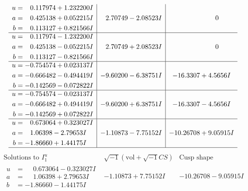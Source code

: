 \documentclass[1p]{elsarticle_modified}
\theoremstyle{definition}
\newcommand{\I}{\sqrt{-1}}
\begin{document}
$$\begin{array}{c|c|c}
\begin{aligned}
u &= \phantom{-}0.117974 + 1.232200 I \\
a &= \phantom{-}0.425138 + 0.052215 I \\
b &= \phantom{-}0.113127 + 0.821566 I\end{aligned}
 & \phantom{-}2.70749 - 2.08523 I & \phantom{-0.000000 } 0 \\ \hline\begin{aligned}
u &= \phantom{-}0.117974 - 1.232200 I \\
a &= \phantom{-}0.425138 - 0.052215 I \\
b &= \phantom{-}0.113127 - 0.821566 I\end{aligned}
 & \phantom{-}2.70749 + 2.08523 I & \phantom{-0.000000 } 0 \\ \hline\begin{aligned}
u &= -0.754574 + 0.023137 I \\
a &= -0.666482 - 0.494419 I \\
b &= -0.142569 - 0.072822 I\end{aligned}
 & -9.60200 - 6.38751 I & -16.3307 + 4.5656 I \\ \hline\begin{aligned}
u &= -0.754574 - 0.023137 I \\
a &= -0.666482 + 0.494419 I \\
b &= -0.142569 + 0.072822 I\end{aligned}
 & -9.60200 + 6.38751 I & -16.3307 - 4.5656 I \\ \hline\begin{aligned}
u &= \phantom{-}0.673064 + 0.323027 I \\
a &= \phantom{-}1.06398 - 2.79653 I \\
b &= -1.86660 + 1.44175 I\end{aligned}
 & -1.10873 - 7.75152 I & -10.26708 + 9.05915 I\\
 \hline 
 \end{array}$$\newpage$$\begin{array}{c|c|c}  
\text{Solutions to }I^u_{1}& \I (\text{vol} + \sqrt{-1}CS) & \text{Cusp shape}\\
 \hline 
\begin{aligned}
u &= \phantom{-}0.673064 - 0.323027 I \\
a &= \phantom{-}1.06398 + 2.79653 I \\
b &= -1.86660 - 1.44175 I\end{aligned}
 & -1.10873 + 7.75152 I & -10.26708 - 9.05915 I \\ \hline\begin{aligned}

\end{aligned}
\end{array}$$
\end{document}
